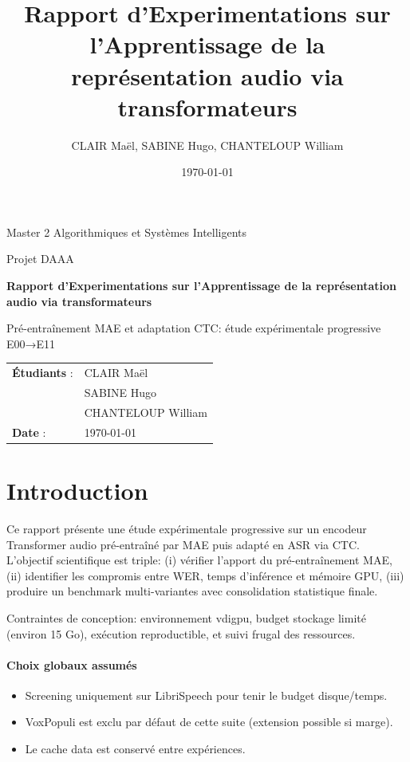 \documentclass[11pt,a4paper]{article}
\title{Rapport d'Experimentations sur l'Apprentissage de la représentation audio via transformateurs}
\author{CLAIR Maël, SABINE Hugo, CHANTELOUP William}
\date{\today}
\begin{document}
\begin{titlepage}
\centering
{\Large Master 2 Algorithmiques et Systèmes Intelligents\par}
\vspace{0.35cm}
{\large Projet DAAA\par}
\vspace{1.3cm}
{\LARGE\bfseries Rapport d'Experimentations sur l'Apprentissage de la représentation audio via transformateurs\par}
\vspace{0.8cm}
{\large Pré-entraînement MAE et adaptation CTC: étude expérimentale progressive E00→E11\par}
\vfill
\begin{tabular}{ll}
\textbf{Étudiants} : & CLAIR Maël \\
 & SABINE Hugo \\
 & CHANTELOUP William \\
\textbf{Date} : & \today \\
\end{tabular}
\vfill
\end{titlepage}

\tableofcontents
\newpage

\section{Introduction}
Ce rapport présente une étude expérimentale progressive sur un encodeur Transformer audio pré-entraîné par MAE puis adapté en ASR via CTC.
L'objectif scientifique est triple: (i) vérifier l'apport du pré-entraînement MAE, (ii) identifier les compromis entre WER, temps d'inférence et mémoire GPU, (iii) produire un benchmark multi-variantes avec consolidation statistique finale.

Contraintes de conception: environnement vdigpu, budget stockage limité (environ 15 Go), exécution reproductible, et suivi frugal des ressources.

\paragraph{Choix globaux assumés}
\begin{itemize}
\item Screening uniquement sur LibriSpeech pour tenir le budget disque/temps.
\item VoxPopuli est exclu par défaut de cette suite (extension possible si marge).
\item Le cache data est conservé entre expériences.
\end{itemize}
\end{document}
